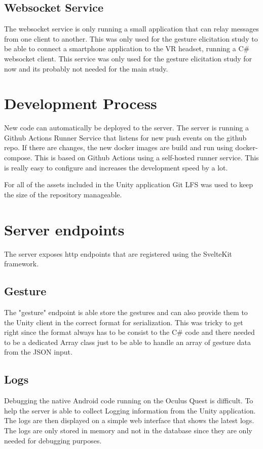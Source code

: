 \subsection{Websocket Service}
The websocket service is only running a small application that can relay messages from one client to another. This was only used for the gesture elicitation study to be able to connect a smartphone application to the VR headset, running a C\# websocket client. This service was only used for the gesture elicitation study for now and its probably not needed for the main study.


\section{Development Process}
New code can automatically be deployed to the server. The server is running a Github Actions Runner Service that listens for new push events on the github repo. If there are changes, the new docker images are build and run using docker-compose. This is based on Github Actions using a self-hosted runner service. This is really easy to configure and increases the development speed by a lot. 

For all of the assets included in the Unity application Git LFS was used to keep the size of the repository manageable.


\section{Server endpoints}
The server exposes http endpoints that are registered using the SvelteKit framework.

\subsection{Gesture}
The "gesture" endpoint is able store the gestures and can also provide them to the Unity client in the correct format for serialization. This was tricky to get right since the format always has to be consist to the C\# code and there needed to be a dedicated Array class just to be able to handle an array of gesture data from the JSON input.

\subsection{Logs}
Debugging the native Android code running on the Oculus Quest is difficult. To help the server is able to collect Logging information from the Unity application. The logs are then displayed on a simple web interface that shows the latest logs. The logs are only stored in memory and not in the database since they are only needed for debugging purposes. 

